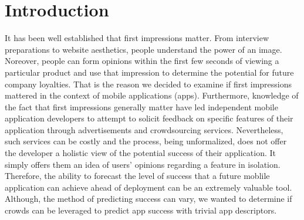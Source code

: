 \section{Introduction}


It has been well established that first impressions matter. From interview preparations to website aesthetics, people understand the power of an image. Noreover, people can form opinions within the first few seconds of viewing a particular product and use that impression to determine the potential for future company loyalties. That is the reason we decided to examine if first impressions mattered in the context of mobile applications (apps).  Furthermore, knowledge of the fact that first impressions generally matter have led independent mobile application developers to attempt to solicit feedback on specific features of their application through advertisements and crowdsourcing services. Nevertheless, such services can be costly and the process, being unformalized, does not offer the developer a holistic view of the potential success of their application.  It simply offers them an idea of users' opinions regarding a feature in isolation.  Therefore, the ability to forecast the level of success that a future moblile application can achieve ahead of deployment can be an extremely valuable tool\cite{tohidi06:getting}. Although, the method of predicting success can vary, we wanted to determine if crowds can be leveraged to predict app success with trivial app descriptors. \\  


